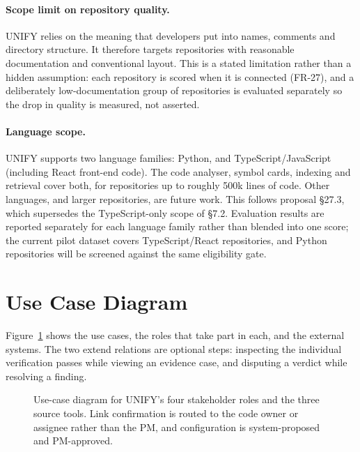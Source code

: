 \paragraph{Scope limit on repository quality.}
UNIFY relies on the meaning that developers put into names, comments and
directory structure. It therefore targets repositories with reasonable
documentation and conventional layout. This is a stated limitation rather than
a hidden assumption: each repository is scored when it is connected (FR-27),
and a deliberately low-documentation group of repositories is evaluated
separately so the drop in quality is measured, not asserted.

\paragraph{Language scope.}
UNIFY supports two language families: Python, and TypeScript/JavaScript
(including React front-end code). The code analyser, symbol cards, indexing and
retrieval cover both, for repositories up to roughly 500k lines of code. Other
languages, and larger repositories, are future work. This follows proposal
§27.3, which supersedes the TypeScript-only scope of §7.2. Evaluation results
are reported separately for each language family rather than blended into one
score; the current pilot dataset covers TypeScript/React repositories, and
Python repositories will be screened against the same eligibility gate.

\section{Use Case Diagram}
\label{sec:usecase-diagram}

Figure~\ref{fig:usecase} shows the use cases, the roles that take part in each,
and the external systems. The two \guillemotleft extend\guillemotright{}
relations are optional steps: inspecting the individual verification passes
while viewing an evidence case, and disputing a verdict while resolving a
finding.

\begin{figure}[htbp]
  \centering
  \resizebox{\linewidth}{!}{}
  \caption{Use-case diagram for UNIFY's four stakeholder roles and the three
           source tools. Link confirmation is routed to the code owner or
           assignee rather than the PM, and configuration is system-proposed
           and PM-approved.}
  \label{fig:usecase}
\end{figure}

